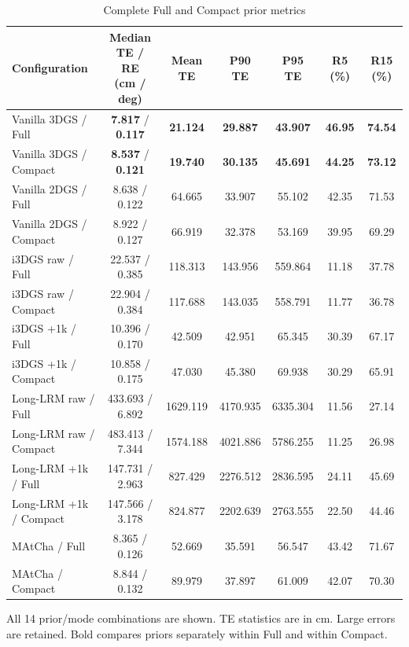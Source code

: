 \begin{table}[tp]
\centering
\footnotesize
\setlength{\tabcolsep}{4pt}
\renewcommand{\arraystretch}{1.12}
\caption{Complete Full and Compact prior metrics}
\label{tab:s_prior_tails}
\begin{tabular}{lcccccc}
\toprule
Configuration & \shortstack{Median TE / RE\\(cm / deg)} & Mean TE & P90 TE & P95 TE & R5 (\%) & R15 (\%) \\
\midrule
Vanilla 3DGS / Full & \textbf{7.817} / \textbf{0.117} & \textbf{21.124} & \textbf{29.887} & \textbf{43.907} & \textbf{46.95} & \textbf{74.54} \\
Vanilla 3DGS / Compact & \textbf{8.537} / \textbf{0.121} & \textbf{19.740} & \textbf{30.135} & \textbf{45.691} & \textbf{44.25} & \textbf{73.12} \\
Vanilla 2DGS / Full & 8.638 / 0.122 & 64.665 & 33.907 & 55.102 & 42.35 & 71.53 \\
Vanilla 2DGS / Compact & 8.922 / 0.127 & 66.919 & 32.378 & 53.169 & 39.95 & 69.29 \\
i3DGS raw / Full & 22.537 / 0.385 & 118.313 & 143.956 & 559.864 & 11.18 & 37.78 \\
i3DGS raw / Compact & 22.904 / 0.384 & 117.688 & 143.035 & 558.791 & 11.77 & 36.78 \\
i3DGS +1k / Full & 10.396 / 0.170 & 42.509 & 42.951 & 65.345 & 30.39 & 67.17 \\
i3DGS +1k / Compact & 10.858 / 0.175 & 47.030 & 45.380 & 69.938 & 30.29 & 65.91 \\
Long-LRM raw / Full & 433.693 / 6.892 & 1629.119 & 4170.935 & 6335.304 & 11.56 & 27.14 \\
Long-LRM raw / Compact & 483.413 / 7.344 & 1574.188 & 4021.886 & 5786.255 & 11.25 & 26.98 \\
Long-LRM +1k / Full & 147.731 / 2.963 & 827.429 & 2276.512 & 2836.595 & 24.11 & 45.69 \\
Long-LRM +1k / Compact & 147.566 / 3.178 & 824.877 & 2202.639 & 2763.555 & 22.50 & 44.46 \\
MAtCha / Full & 8.365 / 0.126 & 52.669 & 35.591 & 56.547 & 43.42 & 71.67 \\
MAtCha / Compact & 8.844 / 0.132 & 89.979 & 37.897 & 61.009 & 42.07 & 70.30 \\
\bottomrule
\end{tabular}
\par\smallskip\begin{minipage}{0.98\linewidth}\footnotesize All 14 prior/mode combinations are shown. TE statistics are in cm. Large errors are retained. Bold compares priors separately within Full and within Compact.\end{minipage}
\end{table}
